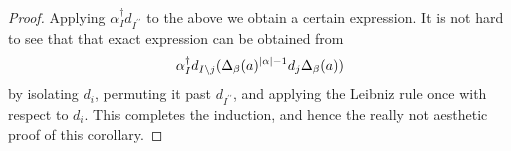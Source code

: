 \begin{cor}
\begin{proof}
  Applying $\alpha^\dagger_I d_{I^{\prime\prime}}$ to the above we obtain a certain expression. It is not hard to see that that exact expression can be obtained from
  \begin{equation*}
    \alpha^\dagger_I d_{I \setminus j} %
      ( \Delta_\beta(a)^{\abs{\alpha}-1} d_j \Delta_\beta (a) )
  \end{equation*}
  by isolating $d_i$, permuting it past $d_{I^{\prime\prime}}$, and applying the Leibniz rule once with respect to $d_i$. This completes the induction, and hence the really not aesthetic proof of this corollary.
  \end{proof}
  \end{cor}
